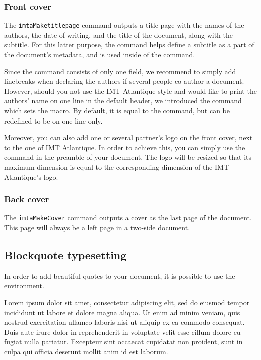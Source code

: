 \documentclass{report}
\begin{document}
\subsubsection{Front cover}
The \texttt{imtaMaketitlepage} command outputs a title page with the names of the authors, the date of writing, and the title of the document, along with the subtitle.
For this latter purpose, the  command helps define a subtitle as a part of the document's metadata, and %
is used inside of the  command.

Since the  command consists of only one field, we recommend to simply add linebreaks when declaring the authors if several people co-author a document. However, should you not use the IMT Atlantique style and would like to print the authors' name on one line in the default header, we introduced the  command which sets the  macro. By default, it is equal to the  command, but can be redefined to be on one line only.

Moreover, you can also add one or several partner's logo on the front cover, next to the one of IMT Atlantique. In order to achieve this, you can simply use the  command in the preamble of your document. The logo will be resized so that its maximum dimension is equal to the corresponding dimension of the IMT Atlantique's logo.


\subsubsection{Back cover}

The \texttt{imtaMakeCover} command outputs a cover as the last page of the document.
This page will always be a left page in a two-side document.


\subsection{Blockquote typesetting}
\label{sec:core:quote}
In order to add beautiful quotes to your document, it is possible to use the  environment.

\begin{imtaQuote}
Lorem ipsum dolor sit amet, consectetur adipiscing elit, sed do eiusmod tempor incididunt ut labore et dolore magna aliqua. 
Ut enim ad minim veniam, quis nostrud exercitation ullamco laboris nisi ut aliquip ex ea commodo consequat. 
Duis aute irure dolor in reprehenderit in voluptate velit esse cillum dolore eu fugiat nulla pariatur.
Excepteur sint occaecat cupidatat non proident, sunt in culpa qui officia deserunt mollit anim id est laborum.
\end{imtaQuote}
\end{document}
